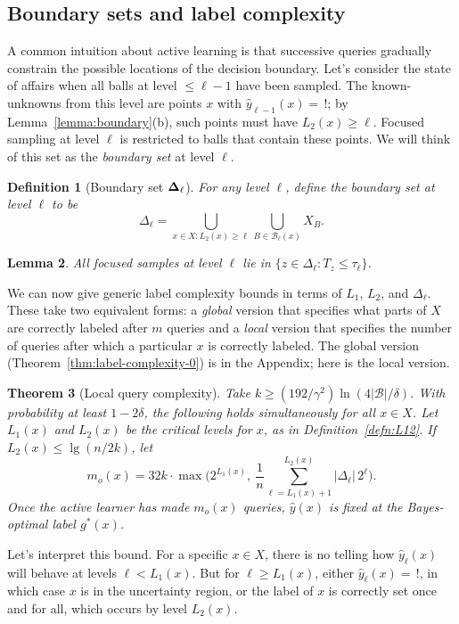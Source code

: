 \documentclass[twoside]{article}
\def\B{{\mathcal B}}
\def\yh{{\widehat{y}}}
\newtheorem{thm}{Theorem}
\newtheorem{lemma}[thm]{Lemma}
\newtheorem{defn}[thm]{Definition}
\begin{document}
\subsection{Boundary sets and label complexity}

A common intuition about active learning is that successive queries gradually constrain the possible locations of the decision boundary. Let's consider the state of affairs when all balls at level $\leq \ell - 1$ have been sampled. The known-unknowns from this level are points $x$ with $\yh_{\ell-1}(x) = \, !$; by Lemma~\ref{lemma:boundary}(b), such points must have $L_2(x) \geq \ell$. Focused sampling at level $\ell$ is restricted to balls that contain these points. We will think of this set as the \emph{boundary set} at level $\ell$.
\begin{defn}[Boundary set $\bf \Delta_\ell$]
For any level $\ell$, define the \emph{boundary set} at level $\ell$ to be
\begin{equation}
\Delta_\ell 
= \bigcup_{x \in X: L_2(x) \geq \ell} \bigcup_{B \in \B_{\ell}(x)} X_B 
.
\label{eq:sampling-region}
\end{equation}
\end{defn}
\begin{lemma}
All focused samples at level $\ell$ lie in $\{z \in \Delta_\ell: T_z \leq \tau_\ell \}$.
\label{lemma:focused}
\end{lemma}

We can now give generic label complexity bounds in terms of $L_1$, $L_2$, and $\Delta_\ell$. These take two equivalent forms: a \emph{global} version that specifies what parts of $X$ are correctly labeled after $m$ queries and a \emph{local} version that specifies the number of queries after which a particular $x$ is correctly labeled. The global version (Theorem~\ref{thm:label-complexity-0}) is in the Appendix; here is the local version.

\begin{thm}[Local query complexity] \label{thm:queryComplexity}
Take $k \geq (192/\gamma^2) \ln (4 |\B|/\delta)$. With probability at least $1-2\delta$, the following holds simultaneously for all $x \in X$. Let $L_1(x)$ and $L_2(x)$ be the critical levels for $x$, as in Definition~\ref{defn:L12}. If $L_2(x) \leq \lg (n/2k)$, let
\[
m_o(x) = 32k \cdot \max\bigg( 2^{L_1(x)}, \ \frac{1}{n} \sum_{\ell=L_1(x)+1}^{L_2(x)} |\Delta_\ell| \, 2^\ell\bigg) .
\]
Once the active learner has made $m_o(x)$ queries, $\yh(x)$ is fixed at the Bayes-optimal label $g^*(x)$.
\label{thm:label-complexity}
\end{thm}
Let's interpret this bound. For a specific $x \in X$, there is no telling how $\yh_\ell(x)$ will behave at levels $\ell < L_1(x)$. But for $\ell \geq L_1(x)$, either $\yh_\ell(x) = \, !$, in which case $x$ is in the uncertainty region, or the label of $x$ is correctly set once and for all, which occurs by level $L_2(x)$. 
\end{document}

